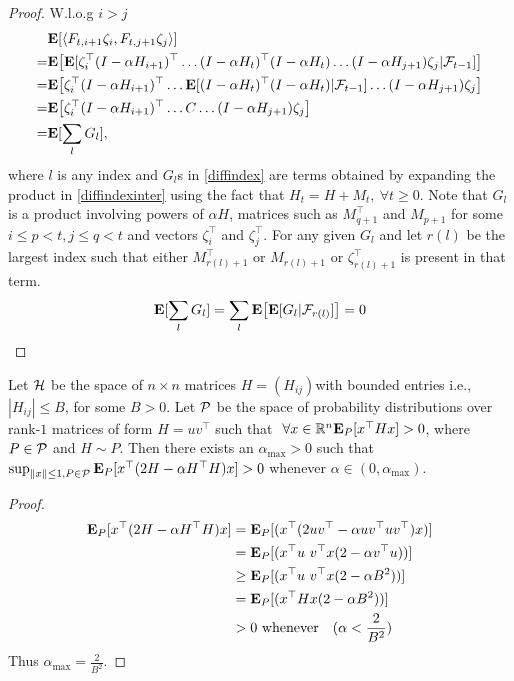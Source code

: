\begin{proof}
W.l.o.g  $i>j$
\begin{align}
&\E[\ip{F_{t,i+1} \zeta_{i},F_{t,j+1} \zeta_{j}}]\nn\\
\label{diffindexinter}=&\E\big[\E[ \zeta^\top_{i}(I-\alpha H_{i+1})^\top\ldots(I-\alpha H_t)^\top(I-\alpha H_t)\ldots(I-\alpha H_{j+1}) \zeta_{j}|\F_{t-1}]\big]\\
=&\E\big[ \zeta^\top_{i}(I-\alpha H_{i+1})^\top\ldots\E[(I-\alpha H_t)^\top(I-\alpha H_t)|\F_{t-1}]\ldots(I-\alpha H_{j+1}) \zeta_{j}\big]\\
=&\E\big[ \zeta^\top_{i}(I-\alpha H_{i+1})^\top\ldots C\ldots(I-\alpha H_{j+1}) \zeta_{j}\big]\\
\label{diffindex}=&\E[ \sum_{l} G_l],
\end{align}
where $l$ is any index and $G_l$s in \eqref{diffindex} are terms obtained by expanding the product in \eqref{diffindexinter} using the fact that $H_t=H+M_{t},~\forall t\geq 0$. Note that $G_l$ is a product involving powers of $\alpha H$, matrices such as $M^\top_{q+1}$ and $M_{p+1}$ for some $ i\leq p<t, j\leq q < t$ and vectors $\zeta^\top_i$ and $\zeta^\top_j$.
For any given $G_l$ and let $r(l)$ be the largest index such that either $M^\top_{r(l)+1}$ or $M_{r(l)+1}$ or $\zeta^\top_{r(l)+1}$ is present in that term.
\begin{align*}
\E[ \sum_{l} G_l]=  \sum_{l} \E\big[\E[G_l|\F_{r(l)}]\big]=0
\end{align*}
\end{proof}






\begin{theorem}
Let $\H$ be the space of $n\times n$ matrices $H=(H_{ij})$with bounded entries i.e., $|H_{ij}|\leq B$, for some $B>0$. Let $\P$ be the space of probability distributions over rank-$1$ matrices of form $H=uv^\top$ such that $~\forall x\in \R^n \E_{P}[x^\top H x]>0$, where $P\in \P$ and $H\sim P$. Then there exists an $\alpha_{\max}>0$ such that 
$\sup_{\norm{x}\leq 1,P\in \P}\E_{P}[x^\top (2H - \alpha H^\top H)x ]>0$ whenever $\alpha\in (0,\alpha_{\max})$.
\end{theorem}

\begin{proof}
\begin{align}
\begin{split}
\E_{P}[x^\top (2H - \alpha H^\top H)x ]&=\E_{P}[( x^\top( 2uv^\top -\alpha uv^\top u v^\top) x ) ]\\
&=\E_{P}[( x^\top u \,\, v^\top x (2-\alpha v^\top u)) ]\\
&\geq\E_{P}[( x^\top u\,\, v^\top x (2-\alpha B^2)) ]\\
&=\E_{P}[( x^\top H x (2-\alpha B^2)) ]\\
&>0 \text{~whenever}\quad (\alpha<\frac{2}{B^2})
\end{split}
\end{align}
Thus $\alpha_{\max}=\frac{2}{B^2}$.
\end{proof}
